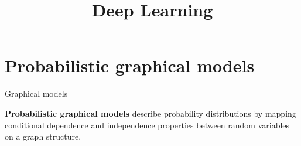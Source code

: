 




\title{Deep Learning}

\date{}


\newcommand{\titlefigure}{plots/FigureDice}
\newcommand{\learninggoals}{
  \item probabilistic graphical models
  \item latent variables
  \item directed graphical models 
}




\section{Probabilistic graphical models}



\begin{frame}{Graphical models}
    
    
    \begin{center}
    \begin{minipage}{.9\textwidth}
    \begin{block}{}
    \begin{center}
    \textbf{Probabilistic graphical models}
    describe probability distributions
    by mapping conditional dependence and independence properties
    between random variables
    on a graph structure.
    \end{center}
    \end{block}
    \end{minipage}
    \end{center}

\end{frame}



